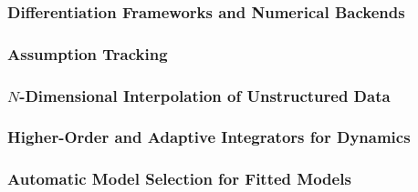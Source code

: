 \subsubsection{Differentiation Frameworks and Numerical Backends}

\subsubsection{Assumption Tracking}

\subsubsection{$N$-Dimensional Interpolation of Unstructured Data}

\subsubsection{Higher-Order and Adaptive Integrators for Dynamics}

\subsubsection{Automatic Model Selection for Fitted Models}
